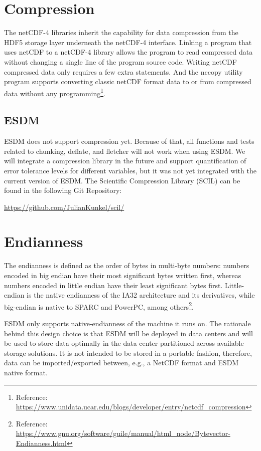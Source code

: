 \section{Compression}

The netCDF-4 libraries inherit the capability for data compression from the HDF5 storage layer underneath the netCDF-4 interface. Linking a program that uses netCDF to a netCDF-4 library allows the program to read compressed data without changing a single line of the program source code. Writing netCDF compressed data only requires a few extra statements. And the nccopy utility program supports converting classic netCDF format data to or from compressed data without any programming\footnote{Reference: \url{https://www.unidata.ucar.edu/blogs/developer/entry/netcdf_compression}}.

\subsection{ESDM}

\tab
ESDM does not support compression yet.
Because of that, all functions and tests related to chunking, deflate, and fletcher will not work when using ESDM.
We will integrate a compression library in the future and support quantification of error tolerance levels for different variables, but it was not yet integrated with the current version of ESDM. The Scientific Compression Library (SCIL) can be found in the following Git Repository:

\begin{center}
\url{https://github.com/JulianKunkel/scil/}
\end{center}

\section{Endianness}

\tab
The endianness is defined as the order of bytes in multi-byte numbers: numbers encoded in big endian have their most significant bytes written first, whereas numbers encoded in little endian have their least significant bytes first. Little-endian is the native endianness of the IA32 architecture and its derivatives, while big-endian is native to SPARC and PowerPC, among others\footnote{Reference: \url{https://www.gnu.org/software/guile/manual/html_node/Bytevector-Endianness.html}}.

ESDM only supports native-endianness of the machine it runs on.
The rationale behind this design choice is that ESDM will be deployed in data centers and will be used to store data optimally in the data center partitioned across available storage solutions.
It is not intended to be stored in a portable fashion, therefore, data can be imported/exported between, e.g., a NetCDF format and ESDM native format.

